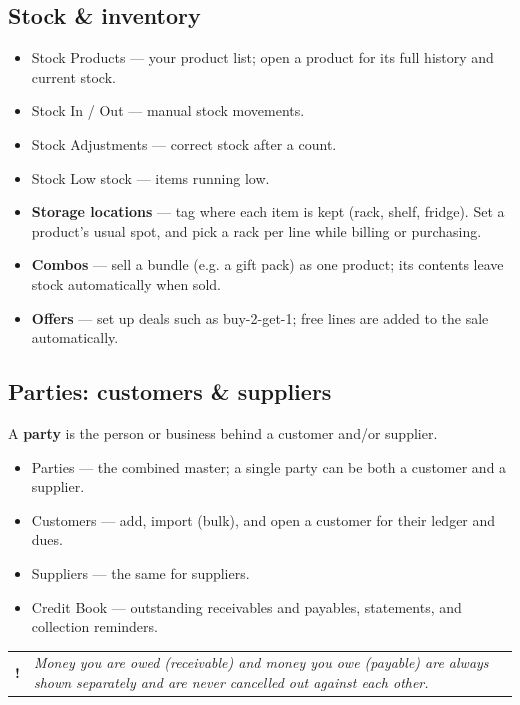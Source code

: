 \documentclass[11pt,a4paper]{article}
\makeatletter
\newcommand{\menu}[1]{\textsf{#1}}
\newenvironment{note}
  {\par\medskip\noindent\begin{tabular}{@{}p{0.03\textwidth}p{0.9\textwidth}@{}}
   \textbf{!} & \itshape}
  {\end{tabular}\par\medskip}
\makeatother
\begin{document}
\subsection{Stock \& inventory}
\begin{itemize}
  \item \menu{Stock \textrightarrow{} Products} --- your product list; open a
        product for its full history and current stock.
  \item \menu{Stock \textrightarrow{} In} / \menu{Out} --- manual stock movements.
  \item \menu{Stock \textrightarrow{} Adjustments} --- correct stock after a count.
  \item \menu{Stock \textrightarrow{} Low stock} --- items running low.
  \item \textbf{Storage locations} --- tag where each item is kept (rack, shelf,
        fridge). Set a product's usual spot, and pick a rack per line while
        billing or purchasing.
  \item \textbf{Combos} --- sell a bundle (e.g. a gift pack) as one product; its
        contents leave stock automatically when sold.
  \item \textbf{Offers} --- set up deals such as buy-2-get-1; free lines are added
        to the sale automatically.
\end{itemize}

\subsection{Parties: customers \& suppliers}
A \textbf{party} is the person or business behind a customer and/or supplier.
\begin{itemize}
  \item \menu{Parties} --- the combined master; a single party can be both a
        customer and a supplier.
  \item \menu{Customers} --- add, import (bulk), and open a customer for their
        ledger and dues.
  \item \menu{Suppliers} --- the same for suppliers.
  \item \menu{Credit Book} --- outstanding receivables and payables, statements,
        and collection reminders.
\end{itemize}

\begin{note}
Money you are owed (receivable) and money you owe (payable) are always shown
separately and are never cancelled out against each other.
\end{note}
\end{document}
